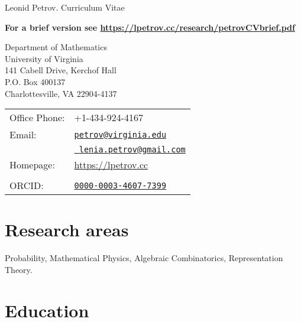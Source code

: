 \documentclass[letterpaper,11pt]{article}
\def\name{Leonid Petrov}
\begin{document}
{\huge \name{}. Curriculum Vitae}
\medskip

\textbf{For a brief version see \url{https://lpetrov.cc/research/petrovCVbrief.pdf}}

\noindent\hrulefill


\vspace{0.25in}


\begin{minipage}{0.45\linewidth}
	Department of Mathematics\\ University of Virginia\\ 141 Cabell Drive,
	Kerchof Hall\\ P.O. Box 400137\\ Charlottesville, VA 22904-4137
\end{minipage}
\begin{minipage}{0.45\linewidth}
	\begin{tabular}{ll}
		Office Phone: & +1-434-924-4167                           \\
		Email:        &
		\href{mailto:petrov@virginia.edu}{\tt petrov@virginia.edu}\\&
		\href{mailto:lenia.petrov@gmail.com}{\tt
			lenia.petrov@gmail.com}
		\\
		Homepage:     & \url{https://lpetrov.cc} \\

		\\
		ORCID:     & \href{https://orcid.org/0000-0003-4607-7399}{\texttt{0000-0003-4607-7399}} \\
	\end{tabular}
\end{minipage}

\section*{Research areas}

Probability, Mathematical Physics, Algebraic Combinatorics, Representation
Theory.

\section*{Education}
\end{document}
